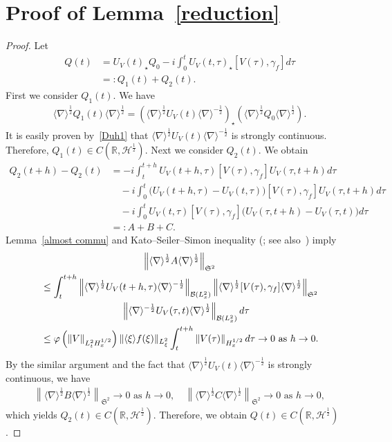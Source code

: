 \documentclass[AHL,Unicode,longabstracts,MathTools,published]{cedram}
\newcommand{\BR}{\mathbb{R}}
\newcommand{\CB}{\mathcal{B}}
\newcommand{\CH}{\mathcal{H}}
\newcommand{\FS}{\mathfrak{S}}
\newcommand{\ga}{\gamma}
\newcommand{\ph}{\varphi}
\newcommand{\ta}{\tau}
\newcommand{\sd}{\langle \nabla \rangle}
\newcommand{\lxr}{\langle \xi \rangle}
\newcommand{\st}{\star}
\newcommand{\tw}{\frac{1}{2}}
\begin{document}
\section{Proof of Lemma~\ref{reduction}}\label{sect6}
\begin{proof}
Let
\begin{align}
Q(t) &= U_V(t)_\st Q_0 - i\int_0^t U_V(t,\ta)_\st [V(\ta),\ga_f] d\ta \\
&=: Q_1(t) + Q_2(t).
\end{align}
First we consider $Q_1(t)$. We have
\begin{align}
\sd^\tw Q_1(t) \sd^\tw = \left(\sd^\tw U_V(t) \sd^{-\tw}\right)_\st \left(\sd^\tw Q_0 \sd^\tw\right).
\end{align}
It is easily proven by~\eqref{Duh1} that $\sd^\tw U_V(t) \sd^{-\tw}$ is strongly continuous. Therefore, $Q_1(t) \in C(\BR, \CH^\tw)$. Next we consider $Q_2(t)$. We obtain
\begin{equation}
\begin{split}
Q_2(t+h) - Q_2(t) &= -i \int_t^{t+h} U_V(t+h,\ta)[V(\ta),\ga_f]U_V(\ta,t+h) d\ta \\
&\quad -i \int_0^t \big(U_V(t+h,\ta)-U_V(t,\ta)\big)[V(\ta),\ga_f]U_V(\ta,t+h) d\ta \\
&\quad -i \int_0^t U_V(t,\ta)[V(\ta),\ga_f]\big(U_V(\ta,t+h)-U_V(\ta,t)\big) d\ta \\
&=: A + B + C.
\end{split}
\end{equation}
Lemma~\ref{almost commu} and Kato--Seiler--Simon inequality (\cite{1975SS}; see also~\cite[Theorem~4.1]{2005Simon}) imply
\begin{multline}
\left\|\sd^\tw A \sd^\tw\right\|_{\FS^2} \\
\begin{aligned}
&\le \int_t^{t+h} \left\|\sd^\tw U_V(t+h,\ta) \sd^{-\tw}\right\|_{\CB(L^2_x)}
\left\|\sd^\tw [V(\ta),\ga_f] \sd^\tw\right\|_{\FS^2}\\
&\mkern150mu
\left\|\sd^{-\tw} U_V(\ta,t) \sd^\tw\right\|_{\CB(L^2_x)} d\ta
\\
&\le \ph\left(\|V\|_{L^2_t H^{1/2}_x}\right) \|\lxr f(\xi)\|_{L^2_\xi} \int_t^{t+h} \left\|V(\ta)\right\|_{H^{1/2}_x}d\ta
\to 0 \text{ as } h \to 0.
\end{aligned}
\end{multline}
By the similar argument and the fact that $\sd^\tw U_V(t) \sd^{-\tw}$ is strongly continuous, we have
\begin{align}
\left\|\sd^\tw B \sd^\tw\right\|_{\FS^2} \to 0 \text{ as } h \to 0, \quad
\left\|\sd^\tw C \sd^\tw\right\|_{\FS^2} \to 0 \text{ as } h \to 0,
\end{align}
which yields $Q_2(t) \in C(\BR, \CH^\tw)$. Therefore, we obtain $Q(t) \in C(\BR, \CH^\tw)$.


\end{proof}
\end{document}
